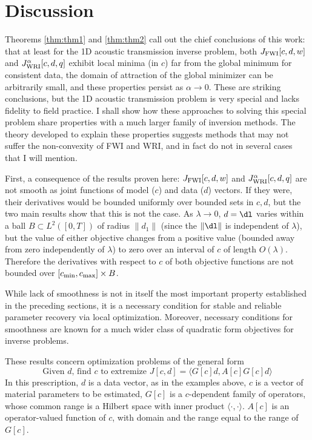 \section{Discussion}
Theorems \ref{thm:thm1} and \ref{thm:thm2} call out the chief
conclusions of this work: that at least for the 1D acoustic
transmission inverse problem, both $J_{\rm FWI}[c,d,w]$ and
$J_{\rm WRI}^{\alpha}[c,d,q]$ exhibit local minima (in $c$) far from the global
minimum for consistent data, the domain of attraction of the
global minimizer can be arbitrarily small, and these properties
persist as $\alpha \rightarrow 0$. These are striking
conclusions, but the 1D acoustic transmission problem is very special
and lacks fidelity to field practice. I shall show how these
approaches to solving this special problem share properties with a
much larger family of inversion methods. The theory developed to
explain these properties suggests methods that may not suffer the
non-convexity of FWI and WRI, and in fact do not in several cases that
I will mention. 

First, a consequence of the results proven here: $J_{\rm FWI}[c,d,w]$
and $J_{\rm WRI}^{\alpha}[c,d,q]$ are not smooth as joint functions of model
($c$) and data ($d$) vectors. If they were, their derivatives would be
bounded uniformly over bounded sets in $c,d$, but the two main results
show that this is not the case. As $\lambda \rightarrow 0$, $d=\dl$
varies within a ball $B \subset L^2([0,T])$ of radius $\|d_1\|$ (since
the $\|\dl\|$ is independent of $\lambda$), but the value of either
objective changes from a positive value (bounded away from zero
independently of $\lambda$) to zero over an interval of $c$ of length
$O(\lambda)$. Therefore the derivatives with respect to $c$ of both
objective functions are not bounded over
$[c_{\rm min},c_{\rm max}] \times B$.

While lack of smoothness is not in itself the most important property
established in the preceding sections, it is a necessary condition for
stable and reliable parameter recovery via local
optimization. Moreover, necessary conditions for smoothness are
known for a much wider class of quadratic form objectives for inverse
problems. 
  
These results
concern optimization problems of the general form
\begin{equation}
  \label{eqn:gen1}
  \mbox{Given }d\mbox{, find }c\mbox{ to extremize }
   J[c,d] = \langle G[c]d, A[c] G[c]d \rangle
\end{equation}
In this prescription, $d$ is a data vector, as in the examples above,
$c$ is a vector of material parameters to be estimated, $G[c]$ is a
$c$-dependent family of operators, whose common range is a Hilbert
space with inner product $\langle \cdot, \cdot \rangle$.
$A[c]$ is an operator-valued function of $c$, with domain and the
range equal to the range of $G[c]$.

